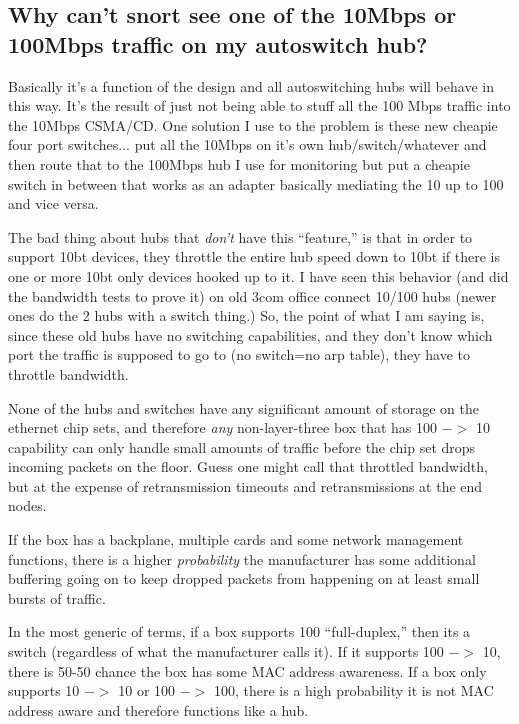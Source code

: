 \documentclass{article}
\begin{document}
\subsection{Why can't snort see one of the 10Mbps or 100Mbps traffic on my autoswitch hub?}

Basically it's a function of the design and all autoswitching hubs will 
behave in this way.  It's the result of just not being able to stuff all 
the 100 Mbps traffic into the 10Mbps CSMA/CD.  One solution I use to the 
problem is these new cheapie four port switches... put all the 10Mbps on 
it's own hub/switch/whatever and then route that to the 100Mbps hub I use 
for monitoring but put a cheapie switch in between that works as an 
adapter basically mediating the 10 up to 100 and vice versa.


The bad thing about hubs that {\em don't} have this ``feature,'' is that
in order to support 10bt devices, they throttle the entire hub speed
down to 10bt if there is one or more 10bt only devices hooked up to it.
I have seen this behavior (and did the bandwidth tests to prove it) on
old 3com office connect 10/100 hubs (newer ones do the 2 hubs with a switch
thing.)  So, the point of what I am saying is, since these old hubs have
no switching capabilities, and they don't know which port the traffic is
supposed to go to (no switch=no arp table), they have to throttle bandwidth.

None of the hubs and switches have any significant amount of storage
on the ethernet chip sets, and therefore {\em any} non-layer-three box that
has 100 $->$ 10 capability can only handle small amounts of traffic before
the chip set drops incoming packets on the floor. Guess one might call
that throttled bandwidth, but at the expense of retransmission timeouts
and retransmissions at the end nodes.

If the box has a backplane, multiple cards and some network management
functions, there is a higher {\em probability} the manufacturer has some
additional buffering going on to keep dropped packets from happening
on at least small bursts of traffic.

In the most generic of terms, if a box supports 100 ``full-duplex,'' then
its a switch (regardless of what the manufacturer calls it). If it
supports 100 $->$ 10, there is 50-50 chance the box has some MAC address
awareness. If a box only supports 10 $->$ 10 or 100 $->$ 100, there is a
high probability it is not MAC address aware and therefore functions
like a hub.
\end{document}
